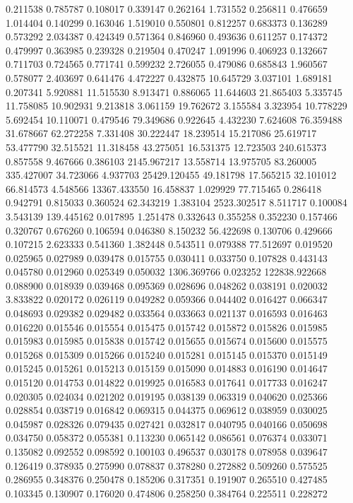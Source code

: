 0.211538
0.785787
0.108017
0.339147
0.262164
1.731552
0.256811
0.476659
1.014404
0.140299
0.163046
1.519010
0.550801
0.812257
0.683373
0.136289
0.573292
2.034387
0.424349
0.571364
0.846960
0.493636
0.611257
0.174372
0.479997
0.363985
0.239328
0.219504
0.470247
1.091996
0.406923
0.132667
0.711703
0.724565
0.771741
0.599232
2.726055
0.479086
0.685843
1.960567
0.578077
2.403697
0.641476
4.472227
0.432875
10.645729
3.037101
1.689181
0.207341
5.920881
11.515530
8.913471
0.886065
11.644603
21.865403
5.335745
11.758085
10.902931
9.213818
3.061159
19.762672
3.155584
3.323954
10.778229
5.692454
10.110071
0.479546
79.349686
0.922645
4.432230
7.624608
76.359488
31.678667
62.272258
7.331408
30.222447
18.239514
15.217086
25.619717
53.477790
32.515521
11.318458
43.275051
16.531375
12.723503
240.615373
0.857558
9.467666
0.386103
2145.967217
13.558714
13.975705
83.260005
335.427007
34.723066
4.937703
25429.120455
49.181798
17.565215
32.101012
66.814573
4.548566
13367.433550
16.458837
1.029929
77.715465
0.286418
0.942791
0.815033
0.360524
62.343219
1.383104
2523.302517
8.511717
0.100084
3.543139
139.445162
0.017895
1.251478
0.332643
0.355258
0.352230
0.157466
0.320767
0.676260
0.106594
0.046380
8.150232
56.422698
0.130706
0.429666
0.107215
2.623333
0.541360
1.382448
0.543511
0.079388
77.512697
0.019520
0.025965
0.027989
0.039478
0.015755
0.030411
0.033750
0.107828
0.443143
0.045780
0.012960
0.025349
0.050032
1306.369766
0.023252
122838.922668
0.088900
0.018939
0.039468
0.095369
0.028696
0.048262
0.038191
0.020032
3.833822
0.020172
0.026119
0.049282
0.059366
0.044402
0.016427
0.066347
0.048693
0.029382
0.029482
0.033564
0.033663
0.021137
0.016593
0.016463
0.016220
0.015546
0.015554
0.015475
0.015742
0.015872
0.015826
0.015985
0.015983
0.015985
0.015838
0.015742
0.015655
0.015674
0.015600
0.015575
0.015268
0.015309
0.015266
0.015240
0.015281
0.015145
0.015370
0.015149
0.015245
0.015261
0.015213
0.015159
0.015090
0.014883
0.016190
0.014647
0.015120
0.014753
0.014822
0.019925
0.016583
0.017641
0.017733
0.016247
0.020305
0.024034
0.021202
0.019195
0.038139
0.063319
0.040620
0.025366
0.028854
0.038719
0.016842
0.069315
0.044375
0.069612
0.038959
0.030025
0.045987
0.028326
0.079435
0.027421
0.032817
0.040795
0.040166
0.050698
0.034750
0.058372
0.055381
0.113230
0.065142
0.086561
0.076374
0.033071
0.135082
0.092552
0.098592
0.100103
0.496537
0.030178
0.078958
0.039647
0.126419
0.378935
0.275990
0.078837
0.378280
0.272882
0.509260
0.575525
0.286955
0.348376
0.250478
0.185206
0.317351
0.191907
0.265510
0.427485
0.103345
0.130907
0.176020
0.474806
0.258250
0.384764
0.225511
0.228272
